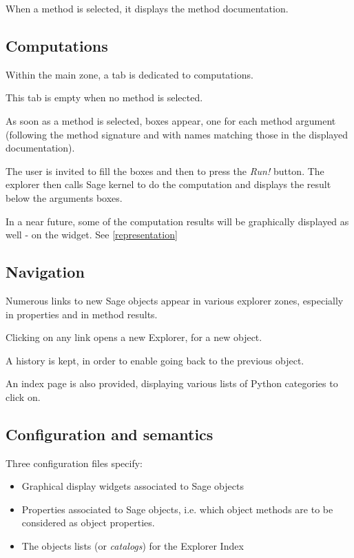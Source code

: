 \documentclass{deliverablereport}
\begin{document}
When a method is selected, it displays the method documentation.

\subsection{Computations}

Within the main zone, a tab is dedicated to computations.

This tab is empty when no method is selected.

As soon as a method is selected, boxes appear, one for each method
argument (following the method signature and with names matching those
in the displayed documentation).

The user is invited to fill the boxes and then to press the
\emph{Run!} button. The explorer then calls Sage kernel to do the
computation and displays the result below the arguments boxes.

In a near future, some of the computation results will be graphically
displayed as well - on the widget. See \ref{representation}


\subsection{Navigation}

Numerous links to new Sage objects appear in various explorer zones,
especially in properties and in method results.

Clicking on any link opens a new Explorer, for a new object.

A history is kept, in order to enable going back to the previous object.

An index page is also provided, displaying various lists of Python
categories to click on.

\subsection{Configuration and semantics}
\label{semantics}

Three configuration files specify:

\begin{itemize}
\item Graphical display widgets associated to Sage objects
  \item Properties associated to Sage objects, i.e. which object methods are
    to be considered as object properties.
\item The objects lists (or \emph{catalogs}) for the Explorer Index
\end{itemize}
\end{document}
